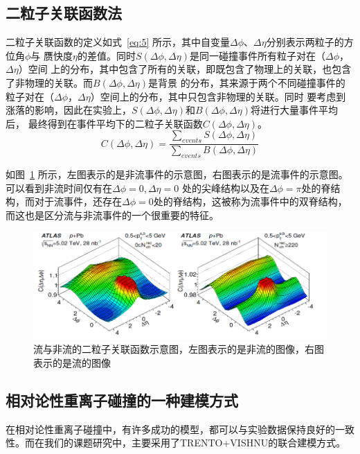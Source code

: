 \documentclass[aps,pre,12pt,preprint,onecolumn,showpacs,showkeys]{revtex4-1}
\begin{document}
\subsection{二粒子关联函数法}
二粒子关联函数的定义如式~\ref{eq:5} 所示\citet{PhysRevC.96.024908,PhysRevLett.116.172302}，其中自变量$\Delta\phi$、$\Delta\eta$分别表示两粒子的方位角$\phi$与
赝快度$\eta$的差值。同时$S(\Delta\phi,\Delta\eta)$是同一碰撞事件所有粒子对在（$\Delta\phi$，$\Delta\eta$）空间
上的分布，其中包含了所有的关联，即既包含了物理上的关联，也包含了非物理的关联。而$B(\Delta\phi,\Delta\eta)$是背景
的分布，其来源于两个不同碰撞事件的粒子对在（$\Delta\phi$，$\Delta\eta$）空间上的分布，其中只包含非物理的关联。同时
要考虑到涨落的影响，因此在实验上，$S(\Delta\phi,\Delta\eta)$和$B(\Delta\phi,\Delta\eta)$将进行大量事件平均后，
最终得到在事件平均下的二粒子关联函数$C(\Delta\phi,\Delta\eta)$。
\begin{equation}
C(\Delta\phi,\Delta\eta)=\frac{\sum_{events}S(\Delta\phi,\Delta\eta)}{\sum_{events}B(\Delta\phi,\Delta\eta)} \label{eq:5}
\end{equation}
\par
如图~\ref{fig:fnf} 所示\citet{PhysRevC.96.024908}，左图表示的是非流事件的示意图，右图表示的是流事件的示意图。可以看到非流时间仅有在$\Delta\phi=0,\Delta\eta=0$
处的尖峰结构以及在$\Delta\phi=\pi$处的脊结构，而对于流事件，还存在$\Delta\phi=0$处的脊结构，这被称为流事件中的双脊结构，
而这也是区分流与非流事件的一个很重要的特征。
\begin{figure}[htbp]
\centering
\includegraphics[width=140mm]{fnf}
\caption{\label{fig:fnf}%
流与非流的二粒子关联函数示意图，左图表示的是非流的图像，右图表示的是流的图像}
\end{figure}
\subsection{相对论性重离子碰撞的一种建模方式}
在相对论性重离子碰撞中，有许多成功的模型，都可以与实验数据保持良好的一致性。而在我们的课题研究中，主要采用了TRENTO+VISHNU的联合建模方式。
\end{document}

